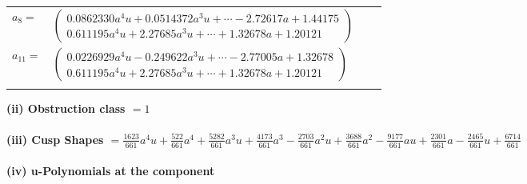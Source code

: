 \documentclass[1p]{elsarticle_modified}
\theoremstyle{definition}
\begin{document}
\begin{tabular}{m{7pt} m{180pt} m{7pt} m{180pt} }
\flushright $a_{8}=$&$\begin{pmatrix}0.0862330 a^{4} u+0.0514372 a^{3} u+\cdots-2.72617 a+1.44175\\0.611195 a^{4} u+2.27685 a^{3} u+\cdots+1.32678 a+1.20121\end{pmatrix}$ \\
\flushright $a_{11}=$&$\begin{pmatrix}0.0226929 a^{4} u-0.249622 a^{3} u+\cdots-2.77005 a+1.32678\\0.611195 a^{4} u+2.27685 a^{3} u+\cdots+1.32678 a+1.20121\end{pmatrix}$\\&\end{tabular}
\flushleft \textbf{(ii) Obstruction class $= 1$}\\~\\
\flushleft \textbf{(iii) Cusp Shapes $= \frac{1623}{661} a^4 u+\frac{522}{661} a^4+\frac{5282}{661} a^3 u+\frac{4173}{661} a^3-\frac{2703}{661} a^2 u+\frac{3688}{661} a^2-\frac{9177}{661} a u+\frac{2301}{661} a-\frac{2465}{661} u+\frac{6714}{661}$}\\~\\
\newpage\renewcommand{\arraystretch}{1}
\flushleft \textbf{(iv) u-Polynomials at the component}\newline \\
\end{document}

